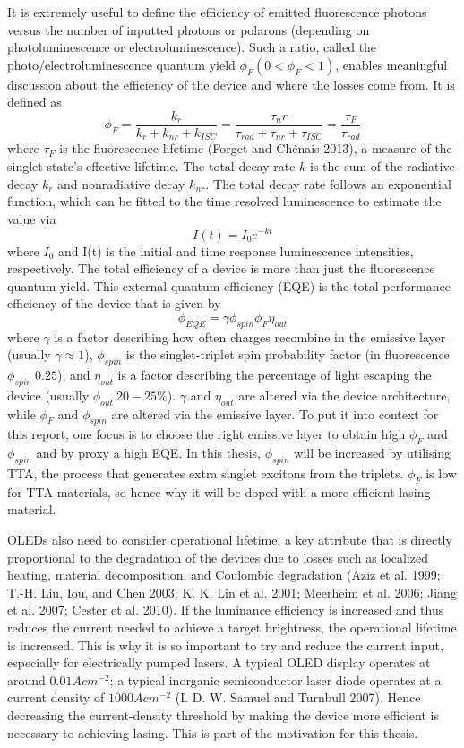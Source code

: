 \documentclass[
  letterpaper,
  DIV=11,
  numbers=noendperiod,
  oneside]{scrreprt}
\begin{document}
It is extremely useful to define the efficiency of emitted fluorescence
photons versus the number of inputted photons or polarons (depending on
photoluminescence or electroluminescence). Such a ratio, called the
photo/electroluminescence quantum yield \(\phi_F(0<\phi_F<1)\), enables
meaningful discussion about the efficiency of the device and where the
losses come from. It is defined as
\[\phi_F = \frac{k_r}{k_r+k_{nr}+k_{ISC}}=\frac{\tau_nr}{\tau_{rad}+\tau_{nr}+\tau_{ISC}}=\frac{\tau_F}{\tau_{rad}}\]
where \(\tau_F\) is the fluorescence lifetime (Forget and Chénais 2013),
a measure of the singlet state's effective lifetime. The total decay
rate \(k\) is the sum of the radiative decay \(k_r\) and nonradiative
decay \(k_{nr}\). The total decay rate follows an exponential function,
which can be fitted to the time resolved luminescence to estimate the
value via \[I(t) = I_0e^{-kt}\] where \(I_0\) and I(t) is the initial
and time response luminescence intensities, respectively. The total
efficiency of a device is more than just the fluorescence quantum yield.
This external quantum efficiency (EQE) is the total performance
efficiency of the device that is given by
\[\phi_{EQE} = \gamma \phi_{spin}\phi_F\eta_{out}\] where \(\gamma\) is
a factor describing how often charges recombine in the emissive layer
(usually \(\gamma \approx 1\)), \(\phi_{spin}\) is the singlet-triplet
spin probability factor (in fluorescence \(\phi_{spin} ~ 0.25\)), and
\(\eta_{out}\) is a factor describing the percentage of light escaping
the device (usually \(\phi_{out} ~ 20-25\%\)). \(\gamma\) and
\(\eta_{out}\) are altered via the device architecture, while \(\phi_F\)
and \(\phi_{spin}\) are altered via the emissive layer. To put it into
context for this report, one focus is to choose the right emissive layer
to obtain high \(\phi_F\) and \(\phi_{spin}\) and by proxy a high EQE.
In this thesis, \(\phi_{spin}\) will be increased by utilising TTA, the
process that generates extra singlet excitons from the triplets.
\(\phi_F\) is low for TTA materials, so hence why it will be doped with
a more efficient lasing material.

OLEDs also need to consider operational lifetime, a key attribute that
is directly proportional to the degradation of the devices due to losses
such as localized heating, material decomposition, and Coulombic
degradation (Aziz et al. 1999; T.-H. Liu, Iou, and Chen 2003; K. K. Lin
et al. 2001; Meerheim et al. 2006; Jiang et al. 2007; Cester et al.
2010). If the luminance efficiency is increased and thus reduces the
current needed to achieve a target brightness, the operational lifetime
is increased. This is why it is so important to try and reduce the
current input, especially for electrically pumped lasers. A typical OLED
display operates at around \(0.01 A cm^{-2}\); a typical inorganic
semiconductor laser diode operates at a current density of
\(1000 A cm^{-2}\) (I. D. W. Samuel and Turnbull 2007). Hence decreasing
the current-density threshold by making the device more efficient is
necessary to achieving lasing. This is part of the motivation for this
thesis.
\end{document}
